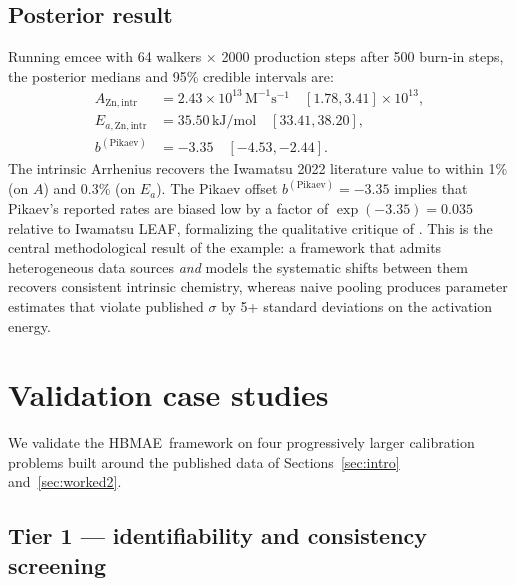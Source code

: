 \documentclass[12pt]{article}
\theoremstyle{plain}
\theoremstyle{definition}
\theoremstyle{remark}
\newcommand{\HBMAE}{HBMAE\xspace}
\begin{document}
\subsection{Posterior result}\label{sec:worked2:result}

Running emcee with 64 walkers $\times$ 2000 production steps after 500
burn-in steps, the posterior medians and 95\% credible intervals are:
%
\begin{align*}
  A_{\mathrm{Zn,intr}} &= 2.43\times 10^{13}\,\mathrm{M}^{-1}\mathrm{s}^{-1}
    \quad [1.78, 3.41]\times 10^{13}, \\
  E_{a,\mathrm{Zn,intr}} &= 35.50\,\mathrm{kJ/mol}\quad [33.41, 38.20], \\
  b^{(\mathrm{Pikaev})} &= -3.35\quad [-4.53, -2.44].
\end{align*}
%
The intrinsic Arrhenius recovers the Iwamatsu 2022 literature value to
within 1\% (on $A$) and 0.3\% (on $E_a$).  The Pikaev offset
$b^{(\mathrm{Pikaev})} = -3.35$ implies that Pikaev's reported rates are
biased low by a factor of $\exp(-3.35) = 0.035$ relative to Iwamatsu LEAF,
formalizing the qualitative critique of \citet{Iwamatsu2022}.  This is the
central methodological result of the example: a framework that admits
heterogeneous data sources \emph{and} models the systematic shifts between
them recovers consistent intrinsic chemistry, whereas naive pooling
produces parameter estimates that violate published $\sigma$ by 5+ standard
deviations on the activation energy.

\section{Validation case studies}\label{sec:validation}

We validate the \HBMAE\ framework on four progressively larger calibration
problems built around the published data of Sections~\ref{sec:intro}
and~\ref{sec:worked2}.

\subsection{Tier 1 --- identifiability and consistency screening}\label{sec:val:tier1}
\end{document}
